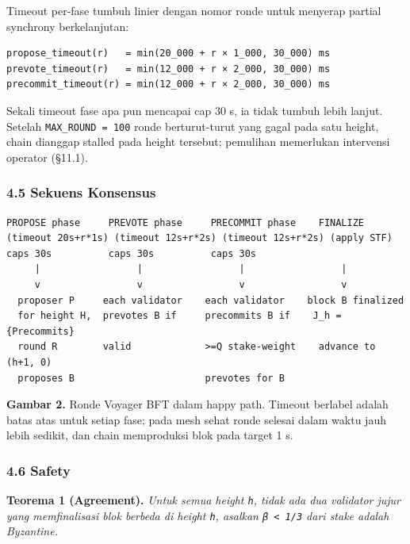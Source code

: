 \documentclass[11pt,a4paper]{article}
\newenvironment{Shaded}{}{}
\begin{document}
Timeout per-fase tumbuh linier dengan nomor ronde untuk menyerap partial synchrony berkelanjutan:

\begin{verbatim}
propose_timeout(r)   = min(20_000 + r × 1_000, 30_000) ms
prevote_timeout(r)   = min(12_000 + r × 2_000, 30_000) ms
precommit_timeout(r) = min(12_000 + r × 2_000, 30_000) ms
\end{verbatim}

Sekali timeout fase apa pun mencapai cap 30 s, ia tidak tumbuh lebih lanjut. Setelah \texttt{MAX\_ROUND\ =\ 100} ronde berturut-turut yang gagal pada satu height, chain dianggap stalled pada height tersebut; pemulihan memerlukan intervensi operator (§11.1).

\hypertarget{sekuens-konsensus}{%
\subsubsection{4.5 Sekuens Konsensus}\label{sekuens-konsensus}}


\begin{Shaded}
\begin{verbatim}
PROPOSE phase     PREVOTE phase     PRECOMMIT phase    FINALIZE
(timeout 20s+r*1s) (timeout 12s+r*2s) (timeout 12s+r*2s) (apply STF)
caps 30s          caps 30s          caps 30s
     |                 |                 |                 |
     v                 v                 v                 v
  proposer P     each validator    each validator    block B finalized
  for height H,  prevotes B if     precommits B if    J_h = {Precommits}
  round R        valid             >=Q stake-weight    advance to (h+1, 0)
  proposes B                       prevotes for B
\end{verbatim}
\end{Shaded}


\textbf{Gambar 2.} Ronde Voyager BFT dalam happy path. Timeout berlabel adalah batas atas untuk setiap fase; pada mesh sehat ronde selesai dalam waktu jauh lebih sedikit, dan chain memproduksi blok pada target 1 s.

\hypertarget{safety}{%
\subsubsection{4.6 Safety}\label{safety}}

\textbf{Teorema 1 (Agreement).} \emph{Untuk semua height \texttt{h}, tidak ada dua validator jujur yang memfinalisasi blok berbeda di height \texttt{h}, asalkan \texttt{β\ \textless{}\ 1/3} dari stake adalah Byzantine.}
\end{document}
